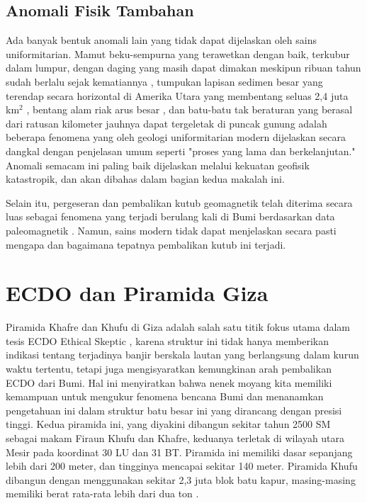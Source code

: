 \documentclass[10pt,twocolumn,letterpaper]{article}
\begin{document}
\subsection{Anomali Fisik Tambahan}
Ada banyak bentuk anomali lain yang tidak dapat dijelaskan oleh sains uniformitarian. Mamut beku-sempurna yang terawetkan dengan baik, terkubur dalam lumpur, dengan daging yang masih dapat dimakan meskipun ribuan tahun sudah berlalu sejak kematiannya \cite{17,18,19}, tumpukan lapisan sedimen besar yang terendap secara horizontal di Amerika Utara yang membentang seluas 2,4 juta km$^2$ \cite{21}, bentang alam riak arus besar \cite{22}, dan batu-batu tak beraturan yang berasal dari ratusan kilometer jauhnya dapat tergeletak di puncak gunung \cite{23,26} adalah beberapa fenomena yang oleh geologi uniformitarian modern dijelaskan secara dangkal dengan penjelasan umum seperti "proses yang lama dan berkelanjutan." Anomali semacam ini paling baik dijelaskan melalui kekuatan geofisik katastropik, dan akan dibahas dalam bagian kedua makalah ini.

Selain itu, pergeseran dan pembalikan kutub geomagnetik telah diterima secara luas sebagai fenomena yang terjadi berulang kali di Bumi berdasarkan data paleomagnetik \cite{35,40,41}. Namun, sains modern tidak dapat menjelaskan secara pasti mengapa dan bagaimana tepatnya pembalikan kutub ini terjadi.

\section{ECDO dan Piramida Giza}

Piramida Khafre dan Khufu di Giza adalah salah satu titik fokus utama dalam tesis ECDO Ethical Skeptic \cite{27}, karena struktur ini tidak hanya memberikan indikasi tentang terjadinya banjir berskala lautan yang berlangsung dalam kurun waktu tertentu, tetapi juga mengisyaratkan kemungkinan arah pembalikan ECDO dari Bumi. Hal ini menyiratkan bahwa nenek moyang kita memiliki kemampuan untuk mengukur fenomena bencana Bumi dan menanamkan pengetahuan ini dalam struktur batu besar ini yang dirancang dengan presisi tinggi. Kedua piramida ini, yang diyakini dibangun sekitar tahun 2500 SM sebagai makam Firaun Khufu dan Khafre, keduanya terletak di wilayah utara Mesir pada koordinat 30 LU dan 31 BT. Piramida ini memiliki dasar sepanjang lebih dari 200 meter, dan tingginya mencapai sekitar 140 meter. Piramida Khufu dibangun dengan menggunakan sekitar 2,3 juta blok batu kapur, masing-masing memiliki berat rata-rata lebih dari dua ton \cite{24, 25}.
\end{document}
